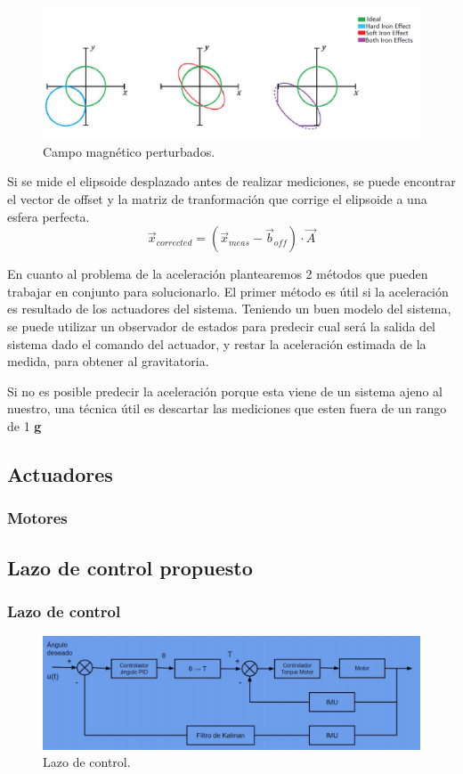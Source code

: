  \begin{figure}[H]
	\center
	\includegraphics[width=0.8\linewidth, page=1,]{Imagenes/efectos}
	\caption{Campo magnético perturbados.}
	\label{fig:Esq_con:efectos}
\end{figure}
Si se mide el elipsoide desplazado antes de realizar mediciones, se puede encontrar el vector de offset y la matriz de tranformaci\'on que corrige el elipsoide a una esfera perfecta.
\begin{equation}
\vec{x}_{corrected} = (\vec{x}_{meas}-\vec{b}_{off}) \cdot \vec{A} 
\end{equation}

En cuanto al problema de la aceleración plantearemos 2 métodos que pueden trabajar en conjunto para solucionarlo.
El primer método es útil si la aceleración es resultado de los actuadores del sistema. Teniendo un buen modelo del sistema, se puede utilizar un observador de estados para predecir cual será la salida del sistema dado el comando del actuador, y restar la aceleración estimada de la medida, para obtener al gravitatoria.


Si no es posible predecir la aceleración porque esta viene de un sistema ajeno al nuestro, una técnica útil es descartar las mediciones que esten fuera de un rango de 1 \textbf{g} 
\subsection{Actuadores}
\subsubsection{Motores}
\subsection{Lazo de control propuesto}
\subsubsection{Lazo de control}
\begin{figure}[H]
	\center
	\includegraphics[width=0.8\linewidth, page=1]{Imagenes/lazo_de_control}
	\caption{Lazo de control.}
	\label{fig:control:lazo}
\end{figure}

